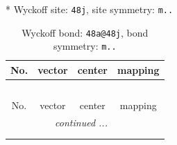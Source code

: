 \documentclass[fleqn,8pt]{jsarticle}
\begin{document}
* Wyckoff site: {\tt 48j}, site symmetry: {\tt m..}
\renewcommand{\arraystretch}{1.2}
\begin{longtable}{cccc}
\caption{Wyckoff bond: {\tt 48a@48j}, bond symmetry: {\tt m..}}
 \\
 \hline \hline
No. & vector & center & mapping \\ \hline \endfirsthead

\multicolumn{3}{l}{\tablename\ \thetable{}} \\
 \hline \hline
No. & vector & center & mapping \\ \hline \endhead

 \hline \hline
\multicolumn{3}{r}{\footnotesize\it continued ...} \\ \endfoot

 \hline \hline
\multicolumn{3}{r}{} \\ \endlastfoot


\end{longtable}
\end{document}
